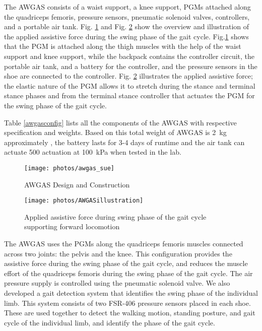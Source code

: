 \documentclass[paper,JRM,paper]{jaciiiarticle}
\begin{document}
The AWGAS consists of a waist support, a knee support, PGMs attached along the quadriceps femoris, pressure sensors, pneumatic solenoid valves, controllers, and a portable air tank. Fig. \ref{fig:aws} and Fig. \ref{fig:awgasillustration} show the overview and illustration of the applied assistive force during the swing phase of the gait cycle. Fig.\ref{fig:aws} shows that the PGM is attached along the thigh muscles with the help of the waist support and knee support, while the backpack contains the controller circuit, the portable air tank, and a battery for the controller, and the pressure sensors in the shoe are connected to the controller. Fig. \ref{fig:awgasillustration} illustrates the applied assistive force; the elastic nature of the PGM allows it to stretch during the stance and terminal stance phases and from the terminal stance controller that actuates the PGM for the swing phase of the gait cycle.

Table \ref{awgasconfig} lists all the components of the AWGAS with respective specification and weights. Based on this total weight of AWGAS is \SI{2}{\kilogram} approximately , the battery lasts for 3-4 days of runtime and the air tank can actuate 500 actuation at \SI{100}{\kilo\pascal} when tested in the lab. 

\begin{figure}[h]
	\centering
	\texttt{[image: photos/awgas\_sue]}
	\caption{AWGAS Design and Construction}
	\label{fig:aws}
\end{figure}
\begin{figure}[h]
	\centering
	\texttt{[image: photos/AWGASillustration]}
	\caption{Applied assistive force during swing phase of the gait cycle supporting forward locomotion}
	\label{fig:awgasillustration}
\end{figure}


The AWGAS uses the PGMs along the quadriceps femoris muscles connected across two joints: the pelvis and the knee. This configuration provides the assistive force during the swing phase of the gait cycle, and reduces the muscle effort of the quadriceps femoris during the swing phase of the gait cycle. The air pressure supply is controlled using the pneumatic solenoid valve. We also developed a gait detection system that identifies the swing phase of the individual limb. This system consists of two FSR-406 pressure sensors placed in each shoe. These are used together to detect the walking motion, standing posture, and gait cycle of the individual limb, and identify the phase of the gait cycle.
\end{document}
